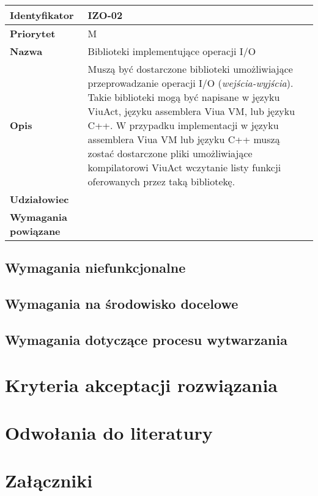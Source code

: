 \documentclass[11pt,oneside,a4paper,titlepage,onecolumn]{article}
\begin{document}
\vspace{1em}

\begin{tabular}{ | l | l | }
    \hline
    \textbf{Identyfikator} & \parbox[t]{11cm}{IZO-02} \\
    \hline
    \textbf{Priorytet} & M \\
    \hline
    \textbf{Nazwa} & Biblioteki implementujące operacji I/O \\
    \hline
    \textbf{Opis} & \parbox[t]{11cm}{
        Muszą być dostarczone biblioteki umożliwiające przeprowadzanie operacji I/O (\emph{wejścia-wyjścia}).
        Takie biblioteki mogą być napisane w języku ViuAct, języku assemblera Viua VM, lub języku C++.
        W przypadku implementacji w języku assemblera Viua VM lub języku C++ muszą zostać dostarczone pliki
        umożliwiające kompilatorowi ViuAct wczytanie listy funkcji oferowanych przez taką bibliotekę.
    } \\
    \hline
    \textbf{Udziałowiec} & \phantom{} \\
    \hline
    \textbf{Wymagania powiązane} & \phantom{} \\
    \hline
\end{tabular}

\subsection{Wymagania niefunkcjonalne}

\subsection{Wymagania na środowisko docelowe}

\subsection{Wymagania dotyczące procesu wytwarzania}

\section{Kryteria akceptacji rozwiązania}

\section{Odwołania do literatury}

\section{Załączniki}
\end{document}
